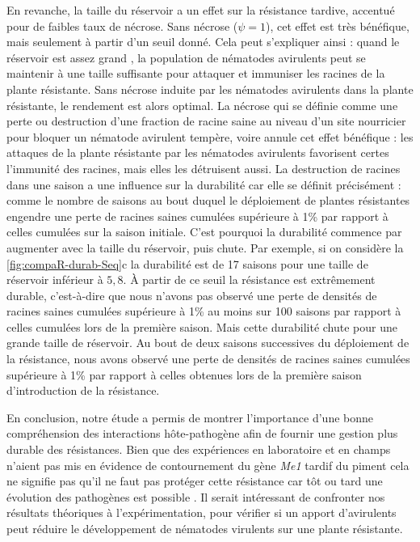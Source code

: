	En revanche, la taille du réservoir a un effet sur la résistance tardive, accentué pour de faibles taux de nécrose. Sans nécrose ($\psi=1$), cet effet est très bénéfique, mais seulement à partir d'un seuil donné. Cela peut s'expliquer ainsi : quand le réservoir est \og assez grand \fg{}, la population de nématodes avirulents peut se maintenir à une taille suffisante pour attaquer et immuniser les racines de la plante résistante. Sans nécrose induite par les nématodes avirulents dans la plante résistante, le rendement est alors optimal. La nécrose  qui se définie comme une perte ou destruction  d'une fraction de racine saine au niveau d'un site nourricier pour bloquer un nématode avirulent tempère, voire annule cet effet bénéfique : les attaques de la plante résistante par les nématodes avirulents favorisent certes l'immunité des racines, mais elles les détruisent aussi. La destruction de racines dans une saison a une influence sur la durabilité car elle se définit précisément : comme le nombre de saisons au bout duquel le déploiement de plantes résistantes engendre une perte de racines saines cumulées supérieure à 1\% par rapport à celles cumulées sur la saison initiale. C’est pourquoi la durabilité commence par augmenter avec la taille du réservoir,
puis chute.  Par exemple, si on considère la \autoref{fig:compaR-durab-Seq}c   la durabilité est de 17 saisons pour une taille de réservoir inférieur à $5,8$. À partir de ce seuil la résistance est extrêmement durable, c'est-à-dire que nous n'avons pas observé une perte de densités de racines saines cumulées supérieure à 1\% au moins sur 100 saisons par rapport à celles cumulées lors de la première saison. Mais cette durabilité chute pour une grande taille de réservoir. Au bout de deux saisons successives du déploiement de la résistance, nous avons observé  une perte de densités de racines saines cumulées supérieure à 1\% par rapport à celles obtenues lors de la première saison d'introduction de la résistance.
	 
	En conclusion, notre étude a permis de montrer l'importance d'une bonne compréhension des interactions hôte-pathogène afin de fournir une gestion plus durable des résistances. 
Bien que des expériences en laboratoire et en champs n'aient pas mis en évidence  de contournement  du  gène \textit{Me1} tardif du piment \citep{Djian-Caporalino2011, Djian-Caporalino2014} cela ne signifie pas qu'il ne  faut pas protéger cette résistance car tôt ou tard une évolution des pathogènes est possible \citep{Parlevliet2002}.  Il serait intéressant de confronter nos résultats théoriques à l'expérimentation, pour vérifier si un apport d'avirulents peut réduire le développement de nématodes virulents sur une plante résistante.
	
